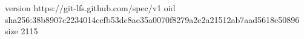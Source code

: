 version https://git-lfs.github.com/spec/v1
oid sha256:38b8907c2234014cefb53dc8ae35a0070f8279a2e2a21512ab7aad5618e50896
size 2115
